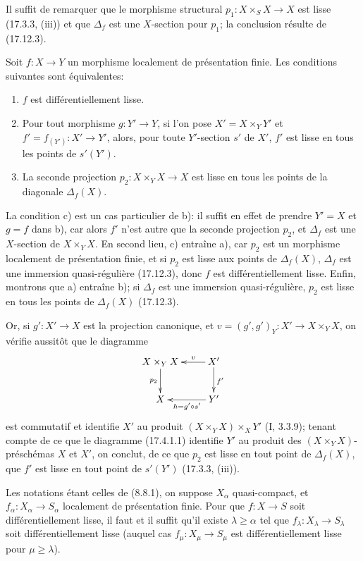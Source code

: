 Il suffit de remarquer que le morphisme structural $p_1:X\times_SX\to X$ est lisse (17.3.3, (iii)) et que $\Delta_f$ est une $X$-section pour $p_1$; la conclusion résulte de (17.12.3).

\begin{proposition}[17.12.5]
\label{IV.17.12.5}
Soit $f:X\to Y$ un morphisme localement de présentation finie. Les conditions suivantes sont équivalentes:
\begin{enumerate}
  \item[a)] $f$ est différentiellement lisse.
  \item[b)] Pour tout morphisme $g:Y'\to Y$, si l'on pose $X'=X\times_Y Y'$ et $f'=f_{(Y')}:X'\to Y'$, alors, pour toute $Y'$-section $s'$ de $X'$, $f'$ est lisse en tous les points de $s'(Y')$.
  \item[c)] La seconde projection $p_2:X\times_YX\to X$ est lisse en tous les points de la diagonale $\Delta_f(X)$.
\end{enumerate}
\end{proposition}


La condition c) est un cas particulier de b): il suffit en effet de prendre $Y'=X$ et $g=f$ dans b), car alors $f'$ n'est autre que la seconde projection $p_2$, et $\Delta_f$ est une $X$-section de $X\times_YX$. En second lieu, c) entraîne a), car $p_2$ est un morphisme localement de présentation finie, et si $p_2$ est lisse aux points de $\Delta_f(X)$, $\Delta_f$ est une immersion quasi-régulière (17.12.3), donc $f$ est différentiellement lisse. Enfin, montrons que a) entraîne b); si $\Delta_f$ est une immersion quasi-régulière, $p_2$ est lisse en tous les points de $\Delta_f(X)$ (17.12.3).

Or, si $g':X'\to X$ est la projection canonique, et $v=(g',g')_Y:X'\to X\times_YX$, on vérifie aussitôt que le diagramme
\[
\xymatrix{
  X\times_Y X \ar[d]_{p_2} & X' \ar[l]_-v \ar[d]^{f'}\\
  X & Y' \ar[l]^{h=g'\circ s'}
}
\]
est commutatif et identifie $X'$ au produit $(X\times_YX)\times_XY'$ (I, 3.3.9); tenant compte de ce que le diagramme (17.4.1.1) identifie $Y'$ au produit des $(X\times_YX)$-préschémas $X$ et $X'$, on conclut, de ce que $p_2$ est lisse en tout point de $\Delta_f(X)$, que $f'$ est lisse en tout point de $s'(Y')$ (17.3.3, (iii)).

\begin{corollary}[17.12.6]
\label{IV.17.12.6}
Les notations étant celles de (8.8.1), on suppose $X_\alpha$ quasi-compact, et $f_\alpha:X_\alpha\to S_\alpha$ localement de présentation finie. Pour que $f:X\to S$ soit différentiellement lisse, il faut et il suffit qu'il existe $\lambda\geq\alpha$ tel que $f_\lambda:X_\lambda\to S_\lambda$ soit différentiellement lisse (auquel cas $f_\mu:X_\mu\to S_\mu$ est différentiellement lisse pour $\mu\geq\lambda$).
\end{corollary}

